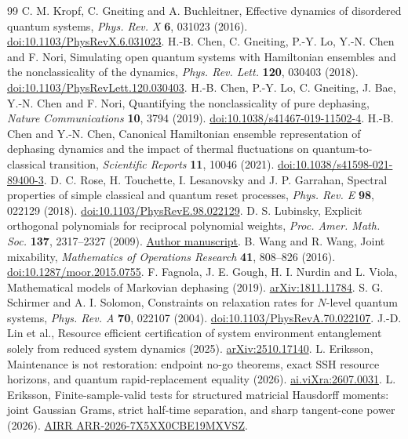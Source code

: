 \documentclass[11pt,a4paper]{article}
\begin{document}
\begin{thebibliography}{99}
 C. M. Kropf, C. Gneiting and A. Buchleitner,
Effective dynamics of disordered quantum systems,
\emph{Phys. Rev. X} \textbf{6}, 031023 (2016).
\href{https://doi.org/10.1103/PhysRevX.6.031023}{doi:10.1103/PhysRevX.6.031023}.
 H.-B. Chen, C. Gneiting, P.-Y. Lo, Y.-N. Chen
and F. Nori, Simulating open quantum systems with Hamiltonian
ensembles and the nonclassicality of the dynamics,
\emph{Phys. Rev. Lett.} \textbf{120}, 030403 (2018).
\href{https://doi.org/10.1103/PhysRevLett.120.030403}{doi:10.1103/PhysRevLett.120.030403}.
 H.-B. Chen, P.-Y. Lo, C. Gneiting, J. Bae,
Y.-N. Chen and F. Nori, Quantifying the nonclassicality of pure
dephasing, \emph{Nature Communications} \textbf{10}, 3794 (2019).
\href{https://doi.org/10.1038/s41467-019-11502-4}{doi:10.1038/s41467-019-11502-4}.
 H.-B. Chen and Y.-N. Chen, Canonical Hamiltonian
ensemble representation of dephasing dynamics and the impact of
thermal fluctuations on quantum-to-classical transition,
\emph{Scientific Reports} \textbf{11}, 10046 (2021).
\href{https://doi.org/10.1038/s41598-021-89400-3}{doi:10.1038/s41598-021-89400-3}.
 D. C. Rose, H. Touchette, I. Lesanovsky and J. P.
Garrahan, Spectral properties of simple classical and quantum reset
processes, \emph{Phys. Rev. E} \textbf{98}, 022129 (2018).
\href{https://doi.org/10.1103/PhysRevE.98.022129}{doi:10.1103/PhysRevE.98.022129}.
 D. S. Lubinsky, Explicit orthogonal polynomials for
reciprocal polynomial weights, \emph{Proc. Amer. Math. Soc.}
\textbf{137}, 2317--2327 (2009).
\href{https://lubinsky.math.gatech.edu/Research%20papers/ExplicitOPAugust2008.pdf}{Author manuscript}.
 B. Wang and R. Wang, Joint mixability,
\emph{Mathematics of Operations Research} \textbf{41}, 808--826 (2016).
\href{https://doi.org/10.1287/moor.2015.0755}{doi:10.1287/moor.2015.0755}.
 F. Fagnola, J. E. Gough, H. I. Nurdin and L. Viola,
Mathematical models of Markovian dephasing (2019).
\href{https://arxiv.org/abs/1811.11784}{arXiv:1811.11784}.
 S. G. Schirmer and A. I. Solomon,
Constraints on relaxation rates for $N$-level quantum systems,
\emph{Phys. Rev. A} \textbf{70}, 022107 (2004).
\href{https://doi.org/10.1103/PhysRevA.70.022107}{doi:10.1103/PhysRevA.70.022107}.
 J.-D. Lin et al., Resource efficient certification of
system environment entanglement solely from reduced system dynamics
(2025). \href{https://arxiv.org/abs/2510.17140}{arXiv:2510.17140}.
 L. Eriksson, Maintenance is not
restoration: endpoint no-go theorems, exact SSH resource horizons,
and quantum rapid-replacement equality (2026).
\href{https://www.ai.vixra.org/abs/2607.0031}{ai.viXra:2607.0031}.
 L. Eriksson, Finite-sample-valid tests for
structured matricial Hausdorff moments: joint Gaussian Grams, strict
half-time separation, and sharp tangent-cone power (2026).
\href{https://airr.science/papers/ARR-2026-7X5XX0CBE19MXVSZ/}{AIRR ARR-2026-7X5XX0CBE19MXVSZ}.


\end{thebibliography}
\end{document}
